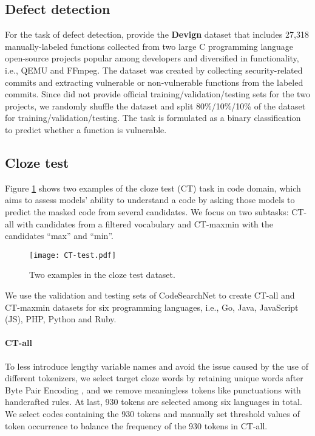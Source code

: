 \documentclass[sigconf,nonacm,screen]{acmart}
\begin{document}
\subsection{Defect detection}
\label{defect_detection_dataset}
For the task of defect detection, \citet{zhou2019devign} provide the \textbf{Devign} dataset that includes 27,318 manually-labeled functions collected from two large C programming language open-source projects popular among developers and diversified in functionality, i.e., QEMU and FFmpeg. The dataset was created by collecting security-related commits and extracting vulnerable or non-vulnerable functions from the labeled commits. 
Since \citet{zhou2019devign} did not provide official training/validation/testing sets for the two projects, we randomly shuffle the dataset and split 80\%/10\%/10\% of the dataset for training/validation/testing. The task is formulated as a binary classification to predict whether a function is vulnerable. 


\subsection{Cloze test}
Figure \ref{fig:clozetest-example} shows two examples of the cloze test (CT) task in code domain, which aims to assess models' ability to understand a code by asking those models to predict the masked code from several candidates. 
We focus on two subtasks: CT-all with candidates from a filtered vocabulary and CT-maxmin with the candidates “max” and “min”.



\begin{figure}[h]
    \texttt{[image: CT-test.pdf]}
    \caption{Two examples in the cloze test dataset.}
    \label{fig:clozetest-example}
\end{figure}

We use the validation and testing sets of CodeSearchNet \cite{husain2019codesearchnet} to create CT-all and CT-maxmin datasets for six programming languages, i.e., Go, Java, JavaScript (JS), PHP, Python and Ruby. 

\paragraph{CT-all} To less introduce lengthy variable names and avoid the issue caused by the use of different tokenizers, we select target cloze words by retaining unique words after Byte Pair Encoding \cite{sennrich2016bpe}, and we remove meaningless tokens like punctuations with handcrafted rules. At last, 930 tokens are selected among six languages in total. We select codes containing the 930 tokens and manually set threshold values of token occurrence to balance the frequency of the 930 tokens in CT-all. 
\end{document}
